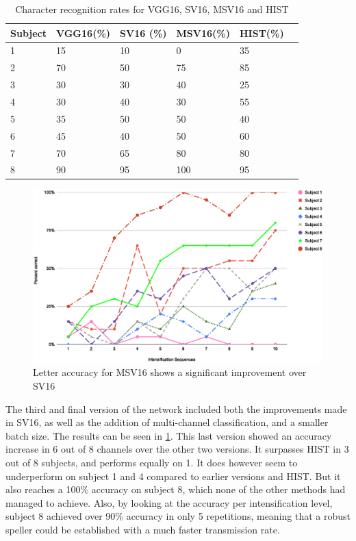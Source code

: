 \documentclass[conference]{IEEEtran}
\begin{document}
\begin{table}[h]
\centering
\begin{tabular}{ |p{1cm}||p{1cm}|p{1cm}|p{1cm}|p{1cm}|p{1cm}| }
 \hline
 Subject & VGG16(\%) & SV16 (\%)  & MSV16(\%) & HIST(\%)\\
 \hline
 1 & 15 & 10 & 0 & 35\\
 2 & 70 & 50 & 75 & 85\\
 3 & 30 & 30 & 40 & 25\\
 4 & 30 & 40 & 30 & 55\\
 5 & 35 & 50 & 50 & 40\\
 6 & 45 & 40 & 50 & 60\\
 7 & 70 & 65 & 80 & 80\\
 8 & 90 & 95 & 100 & 95\\
 \hline
\end{tabular}
\caption[MSV16 accuracy comparison]{Character recognition rates for VGG16, SV16, MSV16 and HIST}
\label{tab:resultsv1v2v3}
\end{table}
\begin{figure}[h]
  \centering
  \includegraphics[width=\linewidth]{images/v3intensification.eps}
  \caption[MSV16 Letter accuracy]{Letter accuracy for MSV16 shows a significant improvement over SV16}
  \label{image:v3intensification}
\end{figure}

The third and final version of the network included both the improvements made in SV16, as well as the addition of multi-channel classification, and a smaller batch size. The results can be seen in \ref{tab:resultsv1v2v3}. This last version showed an accuracy increase in 6 out of 8 channels over the other two versions. It surpasses HIST in 3 out of 8 subjects, and performs equally on 1. 
It does however seem to underperform on subject 1 and 4 compared to earlier versions and HIST. But it also reaches a 100\% accuracy on subject 8, which none of the other methods had managed to achieve.
Also, by looking at the accuracy per intensification level, subject 8 achieved over 90\% accuracy in only 5 repetitions, meaning that a robust speller could be established with a much faster transmission rate. 
\end{document}
